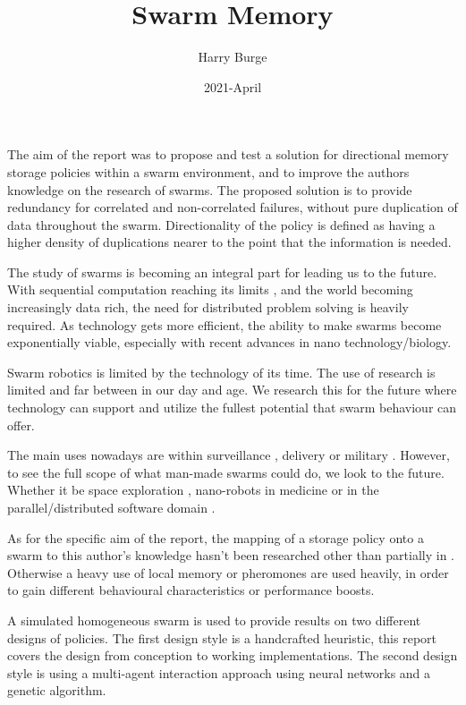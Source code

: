 \documentclass{UoYCSproject}
\author{Harry Burge}
\title{Swarm Memory}
\date{2021-April}
\begin{document}
\maketitle
\listoffigures



\begin{summary}
The aim of the report was to propose and test a solution for directional memory storage policies within a swarm environment, and to improve the authors knowledge on the research of swarms. The proposed solution is to provide redundancy for correlated and non-correlated failures, without pure duplication of data throughout the swarm. Directionality of the policy is defined as having a higher density of duplications nearer to the point that the information is needed.

The study of swarms is becoming an integral part for leading us to the future.
With sequential computation reaching its limits \cite{CPU speed}, and the world becoming increasingly data rich, the need for distributed problem solving is heavily required.
As technology gets more efficient, the ability to make swarms become exponentially viable, especially with recent advances in nano technology/biology.

Swarm robotics is limited by the technology of its time.
The use of research is limited and far between in our day and age.
We research this for the future where technology can support and utilize the fullest potential that swarm behaviour can offer.

The main uses nowadays are within surveillance \cite{UAV, HiveMind}, delivery or military \cite{Swarm robotics reviewed}.
However, to see the full scope of what man-made swarms could do, we look to the future.
Whether it be space exploration \cite{Space exploration}, nano-robots in medicine or in the parallel/distributed software domain \cite{blockchainandSwarm}.

As for the specific aim of the report, the mapping of a storage policy onto a swarm to this author's knowledge hasn’t been researched other than partially in \cite{Cognitive maps mine detection}. Otherwise a heavy use of local memory or pheromones are used heavily, in order to gain different behavioural characteristics or performance boosts.

A simulated homogeneous swarm is used to provide results on two different designs of policies. The first design style is a handcrafted heuristic, this report covers the design from conception to working implementations. The second design style is using a multi-agent interaction approach using neural networks and a genetic algorithm.


\end{summary}
\end{document}
